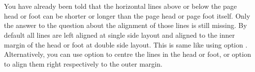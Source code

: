 \begin{Declaration}
  \\
  \\
\end{Declaration}
%
%
%
You have already been told that the horizontal lines above or below the page
head or foot can be shorter or longer than the page head or page foot
itself. Only the answer to the question about the alignment of those lines is
still missing. By default all lines are left aligned at single side layout and
aligned to the inner margin of the head or foot at double side layout. This
is same like using option . Alternatively, you can use option
 to centre the lines in the head or foot, or option
 to align them right respectively to the outer margin.%
%
%
%
%
%


